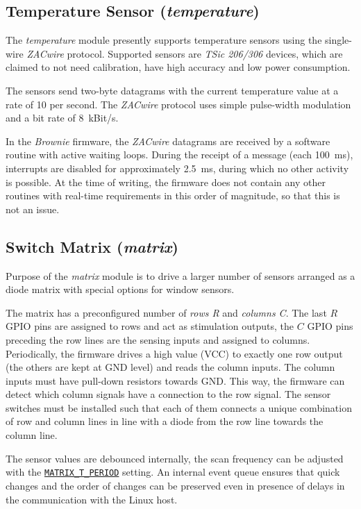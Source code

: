 \documentclass[12pt,english,parskip=half,headheight=19pt]{scrreprt}
\newcommand{\refapic}[1]{\href{home2l-api_c/index.html}{\mbox{\texttt{#1}}}}            %
\begin{document}
\subsection{Temperature Sensor (\textit{temperature})}
\label{sec:brownies-features-temp}

The \textit{temperature} module presently supports temperature sensors using the single-wire \textit{ZACwire} protocol. Supported sensors are \textit{TSic 206/306} devices, which are claimed to not need calibration, have high accuracy and low power consumption.

The sensors send two-byte datagrams with the current temperature value at a rate of 10 per second.
The \textit{ZACwire} protocol uses simple pulse-width modulation and a bit rate of 8~kBit/s.

In the \textit{Brownie} firmware, the \textit{ZACwire} datagrams are received by a software routine with active waiting loops. During the receipt of a message (each 100~ms), interrupts are disabled for approximately 2.5~ms, during which no other activity is possible. At the time of writing, the firmware does not contain any other routines with real-time requirements in this order of magnitude, so that this is not an issue.



\subsection{Switch Matrix (\textit{matrix})}
\label{sec:brownies-features-matrix}

Purpose of the \textit{matrix} module is to drive a larger number of sensors arranged as a diode matrix with special options for window sensors.

The matrix has a preconfigured number of \textit{rows R} and \textit{columns C}. The last $R$ GPIO pins are assigned to rows and act as stimulation outputs, the $C$ GPIO pins preceding the row lines are the sensing inputs and assigned to columns. Periodically, the firmware drives a high value (VCC) to exactly one row output (the others are kept at GND level) and reads the column inputs. The column inputs must have pull-down resistors towards GND. This way, the firmware can detect which column signals have a connection to the row signal. The sensor switches must be installed such that each of them connects a unique combination of row and column lines in line with a diode from the row line towards the column line.

The sensor values are debounced internally, the scan frequency can be adjusted with the \refapic{MATRIX\_T\_PERIOD} setting. An internal event queue ensures that quick changes and the order of changes can be preserved even in presence of delays in the communication with the Linux host.
\end{document}
